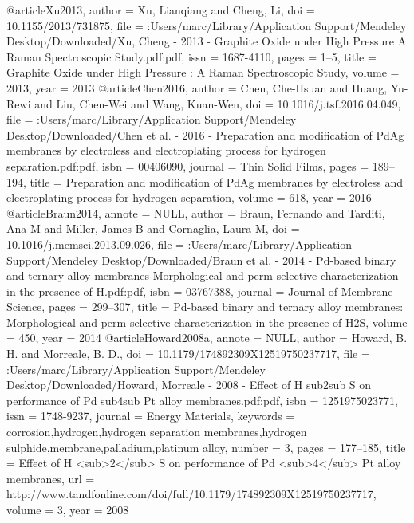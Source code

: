 @article{Xu2013,
author = {Xu, Lianqiang and Cheng, Li},
doi = {10.1155/2013/731875},
file = {:Users/marc/Library/Application Support/Mendeley Desktop/Downloaded/Xu, Cheng - 2013 - Graphite Oxide under High Pressure A Raman Spectroscopic Study.pdf:pdf},
issn = {1687-4110},
pages = {1--5},
title = {{Graphite Oxide under High Pressure : A Raman Spectroscopic Study}},
volume = {2013},
year = {2013}
}
@article{Chen2016,
author = {Chen, Che-Hsuan and Huang, Yu-Rewi and Liu, Chen-Wei and Wang, Kuan-Wen},
doi = {10.1016/j.tsf.2016.04.049},
file = {:Users/marc/Library/Application Support/Mendeley Desktop/Downloaded/Chen et al. - 2016 - Preparation and modification of PdAg membranes by electroless and electroplating process for hydrogen separation.pdf:pdf},
isbn = {00406090},
journal = {Thin Solid Films},
pages = {189--194},
title = {{Preparation and modification of PdAg membranes by electroless and electroplating process for hydrogen separation}},
volume = {618},
year = {2016}
}
@article{Braun2014,
annote = {NULL},
author = {Braun, Fernando and Tarditi, Ana M and Miller, James B and Cornaglia, Laura M},
doi = {10.1016/j.memsci.2013.09.026},
file = {:Users/marc/Library/Application Support/Mendeley Desktop/Downloaded/Braun et al. - 2014 - Pd-based binary and ternary alloy membranes Morphological and perm-selective characterization in the presence of H.pdf:pdf},
isbn = {03767388},
journal = {Journal of Membrane Science},
pages = {299--307},
title = {{Pd-based binary and ternary alloy membranes: Morphological and perm-selective characterization in the presence of H2S}},
volume = {450},
year = {2014}
}
@article{Howard2008a,
annote = {NULL},
author = {Howard, B. H. and Morreale, B. D.},
doi = {10.1179/174892309X12519750237717},
file = {:Users/marc/Library/Application Support/Mendeley Desktop/Downloaded/Howard, Morreale - 2008 - Effect of H sub2sub S on performance of Pd sub4sub Pt alloy membranes.pdf:pdf},
isbn = {1251975023771},
issn = {1748-9237},
journal = {Energy Materials},
keywords = {corrosion,hydrogen,hydrogen separation membranes,hydrogen sulphide,membrane,palladium,platinum alloy},
number = {3},
pages = {177--185},
title = {{Effect of H {\textless}sub{\textgreater}2{\textless}/sub{\textgreater} S on performance of Pd {\textless}sub{\textgreater}4{\textless}/sub{\textgreater} Pt alloy membranes}},
url = {http://www.tandfonline.com/doi/full/10.1179/174892309X12519750237717},
volume = {3},
year = {2008}
}
